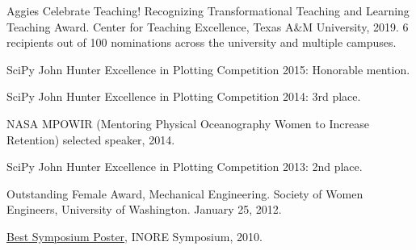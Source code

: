 \documentclass[10pt,letterpaper]{article}
\renewenvironment{itemize}{
  \begin{list}{}{
    \setlength{\leftmargin}{1.5em}
    \setlength{\itemsep}{0.25em}
    \setlength{\parskip}{0pt}
    \setlength{\parsep}{0.25em}
  }
}{
  \end{list}
}
\begin{document}
\begin{itemize}

\item Aggies Celebrate Teaching! Recognizing Transformational Teaching and Learning Teaching Award. Center for Teaching Excellence, Texas A\&M University, 2019. 6 recipients out of 100 nominations across the university and multiple campuses.

\item SciPy John Hunter Excellence in Plotting Competition 2015: Honorable mention.

\item SciPy John Hunter Excellence in Plotting Competition 2014: 3rd place.

\item NASA MPOWIR (Mentoring Physical Oceanography Women to Increase Retention) selected speaker, 2014.

\item SciPy John Hunter Excellence in Plotting Competition 2013: 2nd place.

\item Outstanding Female Award, Mechanical Engineering. Society of Women Engineers, University of Washington. January 25, 2012.

\item \href{http://www.inore.org}{Best Symposium Poster}, INORE Symposium, 2010.


%

\end{itemize}
\end{document}
